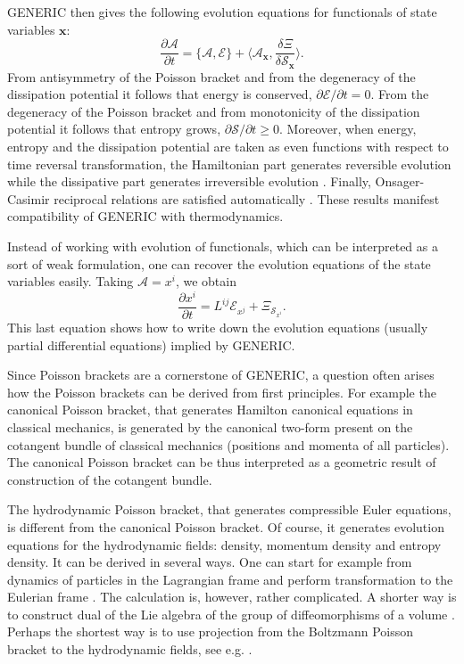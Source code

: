 \documentclass[twoside]{article}
\newcommand{\xx}{{\boldsymbol{x}}}
\newcommand{\AF}{\mathscr{A}}
\newcommand{\SF}{\mathscr{S}}
\newcommand{\EF}{\mathscr{E}}
\newcommand{\pd}{\partial}
\begin{document}
GENERIC then gives the following evolution equations for functionals of state 
variables $\xx$:
\begin{equation}
\frac{\pd \AF}{\pd t} = \{\AF, \EF\} + \langle \AF_\xx, \frac{\delta \Xi}{\delta \SF_\xx}\rangle.
\end{equation}
From antisymmetry of the Poisson bracket and from the degeneracy of the 
dissipation potential it follows that energy is conserved, $\pd\EF/\pd t = 0$. 
From 
the degeneracy of the Poisson bracket and from monotonicity of the dissipation 
potential it follows that entropy grows, $\pd \SF/\pd t \geq 0$. Moreover, when 
energy, entropy and the dissipation potential are taken as even functions with 
respect to time reversal transformation, the Hamiltonian part generates 
reversible evolution 
while the dissipative part generates irreversible evolution 
\cite{Pavelka2014a}. Finally, Onsager-Casimir reciprocal relations are 
satisfied automatically \cite{Pavelka2014a,Ottinger-book}. These results 
manifest compatibility of GENERIC with thermodynamics. 

Instead of working with evolution of functionals, which can be interpreted as a 
sort of weak formulation, one can recover the evolution equations of the state 
variables easily. Taking $\AF = x^i$, we obtain
\begin{equation}\label{eqn.GENERIC}
\frac{\pd x^i}{\pd t} = L^{ij} \EF_{x^j} + \Xi_{\SF_{x^i}}.
\end{equation}
This last equation shows how to 
write down the evolution equations (usually partial differential equations) 
implied by GENERIC.

Since Poisson brackets are a cornerstone of GENERIC, a question often arises 
how the Poisson brackets can be derived from first principles. For example the 
canonical Poisson bracket, that generates Hamilton canonical equations in 
classical mechanics, is generated by the canonical two-form present on the 
cotangent bundle of classical mechanics (positions and momenta of all 
particles). The canonical Poisson bracket can be thus interpreted as a 
geometric result of construction of the cotangent bundle. 

The hydrodynamic Poisson bracket, that generates compressible Euler equations, 
is different from the canonical Poisson bracket. Of course, it generates 
evolution equations for the hydrodynamic fields: density, momentum density and 
entropy density. It can be derived in several ways. One can start for example 
from dynamics of particles in the Lagrangian frame and perform transformation 
to the Eulerian frame \cite{Abarbanel}. The calculation is, however, rather 
complicated. A shorter way is to construct dual of the Lie algebra of the group 
of diffeomorphisms of a volume \cite{MaWe}. Perhaps the shortest way is to use 
projection from the Boltzmann Poisson bracket to the hydrodynamic fields, see 
e.g. \cite{Pavelka2016}. 
\end{document}
